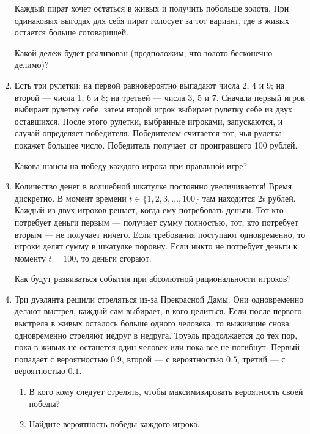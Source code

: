 \documentclass[12pt]{article}
\begin{document}
\begin{enumerate}
   Каждый пират хочет остаться в живых и получить побольше золота. При одинаковых выгодах
   для себя пират голосует за тот вариант, где в живых остается больше сотоварищей.
   
   Какой дележ будет реализован (предположим, что золото бесконечно делимо)?



   \item Есть три рулетки: на первой равновероятно выпадают числа 2, 4 и 9; на второй — числа 1, 6 и 8; на
   третьей — числа 3, 5 и 7. Сначала первый игрок выбирает рулетку себе, 
   затем второй игрок выбирает рулетку себе из двух оставшихся. После этого рулетки, выбранные игроками, запускаются, и
   случай определяет победителя. Победителем считается тот, чья рулетка покажет большее число.
   Победитель получает от проигравшего 100 рублей.

   Какова шансы на победу каждого игрока при правльной игре?

   \item Количество денег в волшебной шкатулке постоянно увеличивается! Время дискретно. В момент
   времени $t \in \{1, 2, 3, \ldots, 100\}$ там находится $2t$ рублей. Каждый из двух игроков решает, когда
   ему потребовать деньги. Тот кто потребует деньги первым — получает сумму полностью, тот, кто
   потребует вторым — не получает ничего. Если требования поступают одновременно, то игроки
   делят сумму в шкатулке поровну. Если никто не потребует деньги к моменту $t = 100$, то деньги
   сгорают.

   Как будут развиваться события при абсолютной рациональности игроков?

   \item Три дуэлянта решили стреляться из-за Прекрасной Дамы. 
   Они одновременно делают выстрел, каждый сам выбирает,
   в кого целиться. Если после первого выстрела в живых осталось больше одного человека, 
   то выжившие снова одновременно стреляют недруг в недруга. Труэль продолжается до тех пор, пока
   в живых не останется один человек или пока все не погибнут. Первый попадает с вероятностью
   $0.9$, второй — с вероятностью $0.5$, третий — с вероятностью $0.1$.
   
   \begin{enumerate}
      \item В кого кому следует стрелять, чтобы максимизировать вероятность своей победы?
      \item Найдите вероятность победы каждого игрока.
   \end{enumerate}
   

\end{enumerate}
\end{document}
